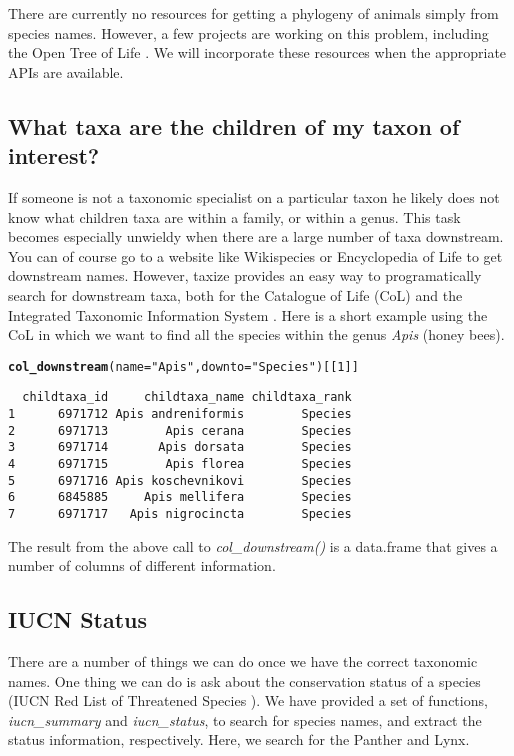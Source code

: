 \documentclass[10pt]{article}\usepackage[]{graphicx}\usepackage[]{color}
\makeatletter
\newcommand{\hlstr}[1]{\textcolor[rgb]{0.192,0.494,0.8}{#1}}%
\newcommand{\hlkwd}[1]{\textcolor[rgb]{0.737,0.353,0.396}{\textbf{#1}}}%
\newenvironment{kframe}{%
 \def\at@end@of@kframe{}%
 \ifinner\ifhmode%
  \def\at@end@of@kframe{\end{minipage}}%
  \begin{minipage}{\columnwidth}%
 \fi\fi%
 \def\FrameCommand##1{\hskip\@totalleftmargin \hskip-\fboxsep
 \colorbox{shadecolor}{##1}\hskip-\fboxsep
     \hskip-\linewidth \hskip-\@totalleftmargin \hskip\columnwidth}%
 \MakeFramed {\advance\hsize-\width
   \@totalleftmargin\z@ \linewidth\hsize
   \@setminipage}}%
 {\par\unskip\endMakeFramed%
 \at@end@of@kframe}
\newenvironment{knitrout}{}{} %
\makeatother
\begin{document}
There are currently no resources for getting a phylogeny of animals simply from species names. However, a few projects are working on this problem, including the Open Tree of Life \cite{opentree}. We will incorporate these resources when the appropriate APIs are available.


\subsection*{What taxa are the children of my taxon of interest?}
If someone is not a taxonomic specialist on a particular taxon he likely does not know what children taxa are within a family, or within a genus. This task becomes especially unwieldy when there are a large number of taxa downstream. You can of course go to a website like Wikispecies \cite{wikispecies} or Encyclopedia of Life \cite{eol} to get downstream names. However, taxize provides an easy way to programatically search for downstream taxa, both for the Catalogue of Life (CoL) \cite{col} and the Integrated Taxonomic Information System \cite{itis}. Here is a short example using the CoL in which we want to find all the species within the genus \emph{Apis} (honey bees).

\begin{knitrout}
\color{fgcolor}\begin{kframe}
\begin{alltt}
\hlkwd{col_downstream}(name = \hlstr{"Apis"}, downto = \hlstr{"Species"})[[1]]
\end{alltt}
\begin{verbatim}
  childtaxa_id     childtaxa_name childtaxa_rank
1      6971712 Apis andreniformis        Species
2      6971713        Apis cerana        Species
3      6971714       Apis dorsata        Species
4      6971715        Apis florea        Species
5      6971716 Apis koschevnikovi        Species
6      6845885     Apis mellifera        Species
7      6971717   Apis nigrocincta        Species
\end{verbatim}
\end{kframe}
\end{knitrout}


The result from the above call to \emph{col\_downstream()} is a data.frame that gives a number of columns of different information. 

\subsection*{IUCN Status}
There are a number of things we can do once we have the correct taxonomic names. One thing we can do is ask about the conservation status of a species (IUCN Red List of Threatened Species \cite{iucn}). We have provided a set of functions, \emph{iucn\_summary} and \emph{iucn\_status}, to search for species names, and extract the status information, respectively. Here, we search for the Panther and Lynx.  
\end{document}
